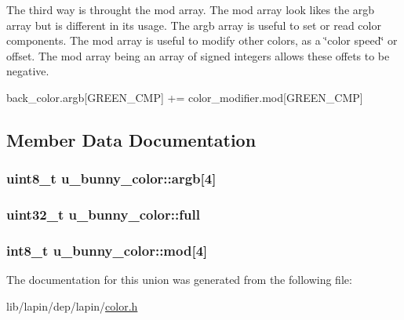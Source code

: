 The third way is throught the mod array. The mod array look likes the argb array but is different in its usage. The argb array is useful to set or read color components. The mod array is useful to modify other colors, as a \char`\"{}color speed\char`\"{} or offset. The mod array being an array of signed integers allows these offets to be negative.
\begin{DoxyItemize}
\item back\-\_\-color.\-argb\mbox{[}G\-R\-E\-E\-N\-\_\-\-C\-M\-P\mbox{]} += color\-\_\-modifier.\-mod\mbox{[}G\-R\-E\-E\-N\-\_\-\-C\-M\-P\mbox{]} 
\end{DoxyItemize}

\subsection{Member Data Documentation}
\hypertarget{unionu__bunny__color_a7330b391a73e6d90e8c64ffaaa1315e5}{
\subsubsection[{argb}]{\setlength{\rightskip}{0pt plus 5cm}uint8\-\_\-t u\-\_\-bunny\-\_\-color\-::argb\mbox{[}4\mbox{]}}}\label{unionu__bunny__color_a7330b391a73e6d90e8c64ffaaa1315e5}
\hypertarget{unionu__bunny__color_a4f04c3adea96c3bfed398cdc0661490f}{
\subsubsection[{full}]{\setlength{\rightskip}{0pt plus 5cm}uint32\-\_\-t u\-\_\-bunny\-\_\-color\-::full}}\label{unionu__bunny__color_a4f04c3adea96c3bfed398cdc0661490f}
\hypertarget{unionu__bunny__color_a8e82ba841d3953edfff632732c2893b1}{
\subsubsection[{mod}]{\setlength{\rightskip}{0pt plus 5cm}int8\-\_\-t u\-\_\-bunny\-\_\-color\-::mod\mbox{[}4\mbox{]}}}\label{unionu__bunny__color_a8e82ba841d3953edfff632732c2893b1}


The documentation for this union was generated from the following file\-:\begin{DoxyCompactItemize}
\item 
lib/lapin/dep/lapin/\hyperlink{color_8h}{color.\-h}\end{DoxyCompactItemize}
